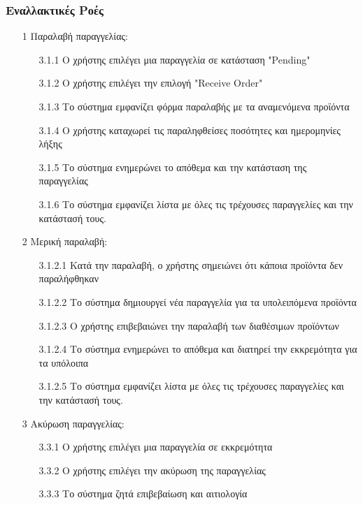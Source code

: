 \documentclass[12pt,a4paper,twoside]{book}
\begin{document}
\subsubsection{Εναλλακτικές Ροές}
\begin{enumerate}
  \item[1 ] Παραλαβή παραγγελίας:
        \begin{enumerate}
          \item[3.1.1 ] Ο χρήστης επιλέγει μια παραγγελία σε κατάσταση "Pending" %
          \item[3.1.2 ] Ο χρήστης επιλέγει την επιλογή "Receive Order" %
          \item[3.1.3 ] Το σύστημα εμφανίζει φόρμα παραλαβής με τα αναμενόμενα προϊόντα
          \item[3.1.4 ] Ο χρήστης καταχωρεί τις παραληφθείσες ποσότητες και ημερομηνίες λήξης
          \item[3.1.5 ] Το σύστημα ενημερώνει το απόθεμα και την κατάσταση της παραγγελίας
          \item[3.1.6 ] Το σύστημα εμφανίζει λίστα με όλες τις τρέχουσες παραγγελίες και την κατάστασή τους.
        \end{enumerate}
  \item[2 ] Μερική παραλαβή:
        \begin{enumerate}
          \item[3.1.2.1 ] Κατά την παραλαβή, ο χρήστης σημειώνει ότι κάποια προϊόντα δεν παραλήφθηκαν
          \item[3.1.2.2 ] Το σύστημα δημιουργεί νέα παραγγελία για τα υπολειπόμενα προϊόντα
          \item[3.1.2.3 ] Ο χρήστης επιβεβαιώνει την παραλαβή των διαθέσιμων προϊόντων
          \item[3.1.2.4 ] Το σύστημα ενημερώνει το απόθεμα και διατηρεί την εκκρεμότητα για τα υπόλοιπα
          \item[3.1.2.5] Το σύστημα εμφανίζει λίστα με όλες τις τρέχουσες παραγγελίες και την κατάστασή τους.
        \end{enumerate}
  \item[3 ] Ακύρωση παραγγελίας:
        \begin{enumerate}
          \item[3.3.1 ] Ο χρήστης επιλέγει μια παραγγελία σε εκκρεμότητα
          \item[3.3.2 ] Ο χρήστης επιλέγει την ακύρωση της παραγγελίας
          \item[3.3.3 ] Το σύστημα ζητά επιβεβαίωση και αιτιολογία

\end{enumerate}
\end{enumerate}
\end{document}
